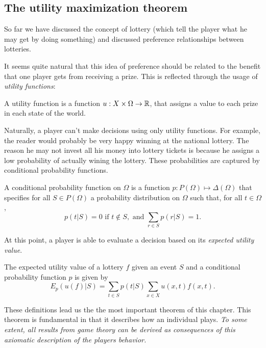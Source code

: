 \subsection{The utility maximization theorem}

So far we have discussed the concept of lottery (which tell the player what he may get by doing something) and discussed preference relationships between lotteries.

It seems quite natural that this idea of preference should be related to the benefit that one player gets from receiving a prize. This is reflected through the usage of \emph{utility functions}:

\begin{definition}
A utility function is a function $u : X \times \Omega \rightarrow \mathbb{R}$, that assigns a value to each prize in each state of the world.
\end{definition}

Naturally, a player can't make decisions using only utility functions. For example, the reader would probably be very happy winning at the national lottery. The reason he may not invest all his money into lottery tickets is because he assigns a low probability of actually wining the lottery. These probabilities are captured by conditional probability functions.

\begin{definition}
A conditional probability function on $\Omega$ is a function $p : P(\Omega) \mapsto \Delta(\Omega)$ that specifies for all $S \in P(\Omega)$ a probability distribution on $\Omega$ such that, for all $t \in \Omega$,
$$ p(t|S) =  0 \text{ if } t \not \in S, \text{ and } \sum_{r \in S} p(r| S) = 1.$$
\end{definition}

At this point, a player is able to evaluate a decision based on its \emph{expected utility value}.

\begin{definition}
The expected utility value of a lottery $f$ given an event $S$ and a conditional probability function $p$ is given by
$$ E_p(u(f)|S) = \sum_{t \in S} p(t|S) \sum_{x \in X} u(x,t) f(x,t).$$
\end{definition}

These definitions lead us the the most important theorem of this chapter. This theorem is fundamental in that it describes how an individual plays.  \emph{To some extent, all results from game theory can be derived as consequences of this axiomatic description of the players behavior.
}


